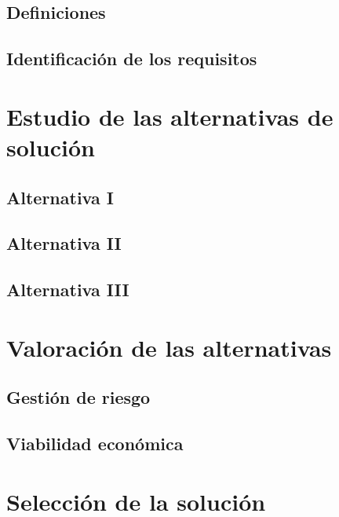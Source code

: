 \documentclass[10pt,a4paper,oldfontcommands]{apuntes}
\begin{document}
\subsection{Definiciones}
\subsection{Identificación de los requisitos}


\section{Estudio de las alternativas de solución}
\subsection{Alternativa I}
\subsection{Alternativa II}
\subsection{Alternativa III}

\section{Valoración de las alternativas}
\subsection{Gestión de riesgo}
\subsection{Viabilidad económica}

\section{Selección de la solución}
\end{document}
